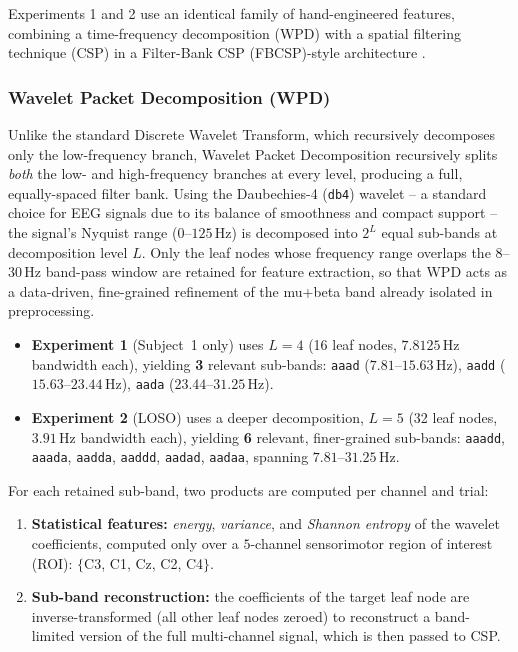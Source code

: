 \documentclass[11pt,a4paper]{article}
\begin{document}
Experiments 1 and 2 use an identical family of hand-engineered features, combining a
time-frequency decomposition (WPD) with a spatial filtering technique (CSP) in a Filter-Bank CSP
(FBCSP)-style architecture \cite{ang2008fbcsp}.

\subsubsection{Wavelet Packet Decomposition (WPD)}
Unlike the standard Discrete Wavelet Transform, which recursively decomposes only the low-frequency
branch, Wavelet Packet Decomposition recursively splits \emph{both} the low- and high-frequency
branches at every level, producing a full, equally-spaced filter bank. Using the Daubechies-4
(\texttt{db4}) wavelet -- a standard choice for EEG signals due to its balance of smoothness and
compact support -- the signal's Nyquist range ($0$--$125$\,Hz) is decomposed into $2^{L}$ equal
sub-bands at decomposition level $L$. Only the leaf nodes whose frequency range overlaps the
$8$--$30$\,Hz band-pass window are retained for feature extraction, so that WPD acts as a
data-driven, fine-grained refinement of the mu+beta band already isolated in preprocessing.

\begin{itemize}[leftmargin=1.2cm]
    \item \textbf{Experiment 1} (Subject~1 only) uses $L=4$ (16 leaf nodes, $7.8125$\,Hz bandwidth
    each), yielding \textbf{3} relevant sub-bands: \texttt{aaad} ($7.81$--$15.63$\,Hz),
    \texttt{aadd} ($15.63$--$23.44$\,Hz), \texttt{aada} ($23.44$--$31.25$\,Hz).
    \item \textbf{Experiment 2} (LOSO) uses a deeper decomposition, $L=5$ (32 leaf nodes,
    $3.91$\,Hz bandwidth each), yielding \textbf{6} relevant, finer-grained sub-bands:
    \texttt{aaadd}, \texttt{aaada}, \texttt{aadda}, \texttt{aaddd}, \texttt{aadad}, \texttt{aadaa},
    spanning $7.81$--$31.25$\,Hz.
\end{itemize}

For each retained sub-band, two products are computed per channel and trial:
\begin{enumerate}[leftmargin=1.2cm]
    \item \textbf{Statistical features:} \emph{energy}, \emph{variance}, and \emph{Shannon entropy}
    of the wavelet coefficients, computed only over a $5$-channel sensorimotor region of interest
    (ROI): $\{$C3, C1, Cz, C2, C4$\}$.
    \item \textbf{Sub-band reconstruction:} the coefficients of the target leaf node are inverse-transformed
    (all other leaf nodes zeroed) to reconstruct a band-limited version of the full multi-channel
    signal, which is then passed to CSP.
\end{enumerate}
\end{document}
